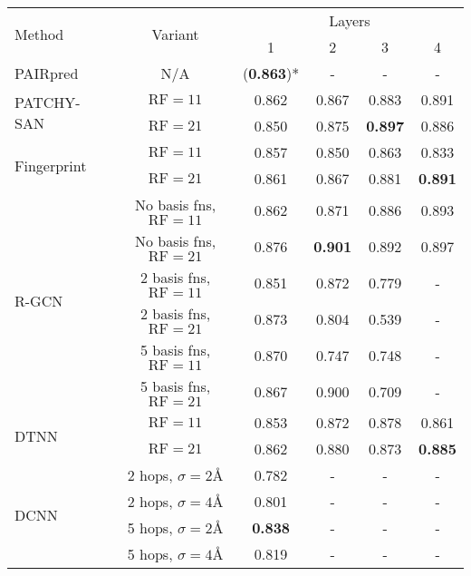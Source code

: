 \begin{table}
	\begin{center}
		\begin{tabular}{l c c c c c }
			\toprule
			
			\multirow{2}{*}{Method} & \multirow{2}{*}{Variant} &  \multicolumn{4}{c}{Layers} \\
											 & & 1 & 2 & 3 & 4 \\
			\midrule
			PAIRpred~\cite{minhas2014}   & N/A  & (\textbf{0.863})* & - & - & - \\

			\midrule
			\multirow{2}{*}{PATCHY-SAN~\cite{niepert2016}}  & $\text{RF}=11$ & 0.862 & 0.867 & 0.883 & 0.891 \\
										 & $\text{RF}=21$ & 0.850 & 0.875 & \textbf{0.897} & 0.886 \\
			\midrule
			\multirow{2}{*}{Fingerprint~\cite{duvenaud2015}}  & $\text{RF}=11$ & 0.857 & 0.850 & 0.863 & 0.833 \\
										  & $\text{RF}=21$ & 0.861 & 0.867 & 0.881 & \textbf{0.891} \\
			\midrule

			\multirow{6}{*}{R-GCN~\cite{schlichtkrull2017}} & No basis fns, $\text{RF}=11$ & 0.862 & 0.871 & 0.886 & 0.893 \\
								   & No basis fns, $\text{RF}=21$ & 0.876 & \textbf{0.901} & 0.892 & 0.897 \\
								   & 2 basis fns, $\text{RF}=11$ & 0.851 & 0.872 & 0.779 & -	   \\
								   & 2 basis fns, $\text{RF}=21$ & 0.873 & 0.804 & 0.539 & -     \\
								   & 5 basis fns, $\text{RF}=11$ & 0.870 & 0.747 & 0.748 & -	   \\
								   & 5 basis fns, $\text{RF}=21$ & 0.867 & 0.900 & 0.709 & -     \\
			\midrule
			\multirow{2}{*}{DTNN~\cite{schutt2017}}& $\text{RF}=11$ & 0.853 & 0.872 & 0.878 & 0.861 \\
			& $\text{RF}=21$ & 0.862 & 0.880 & 0.873 & \textbf{0.885} \\
			\midrule
			\multirow{4}{*}{DCNN~\cite{atwood2016}} & 2 hops, $\sigma=2$\AA{} & 0.782 & - & - & - \\
										& 2 hops, $\sigma=4$\AA{} & 0.801 & - & - & - \\
										& 5 hops, $\sigma=2$\AA{} & \textbf{0.838} & - & - & - \\ 
										& 5 hops, $\sigma=4$\AA{} & 0.819 & - & - & - \\ 
												  

\end{tabular}
\end{center}
\end{table}
